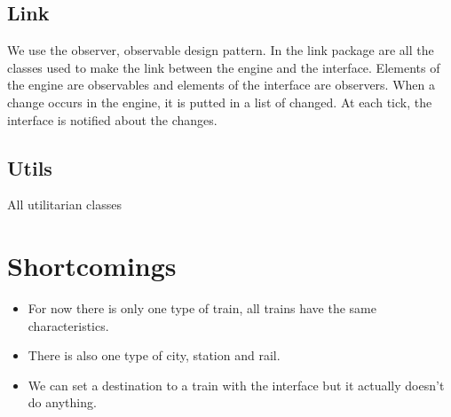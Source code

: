 \documentclass{article}
\begin{document}
\subsection{Link}
We use the observer, observable design pattern.
In the link package are all the classes used to make the link between the engine and the interface.
Elements of the engine are observables and elements of the interface are observers.
When a change occurs in the engine, it is putted in a list of changed.
At each tick, the interface is notified about the changes.

\subsection{Utils}
All utilitarian classes

\section{Shortcomings}
\begin{itemize}
	\item For now there is only one type of train, all trains have the same characteristics.
	\item There is also one type of city, station and rail.
	\item We can set a destination to a train with the interface but it actually doesn't do anything.
\end{itemize}
\end{document}
